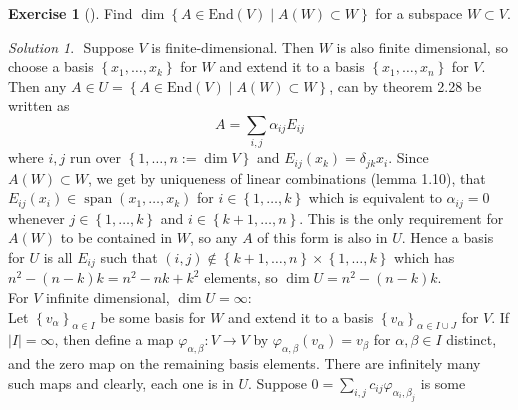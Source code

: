 \documentclass[reqno]{amsart}
\theoremstyle{definition}
\newtheorem{exercise}[theorem]{Exercise}
\theoremstyle{remark}
\newtheorem*{solution}{Solution}
\DeclareMathOperator{\Span}{span}
\newcommand{\End}{{\mathrm{End}}}
\begin{document}
    \begin{exercise}[]
        Find $\dim \left\{ A \in \End (V)  \mid A (W) \subset W
        \right\} $ for a subspace $W \subset V$.
    \end{exercise}

    \begin{solution}
        $ $ \newline
        Suppose $V$ is finite-dimensional.
        Then $W$ is also finite dimensional, so
        choose a basis $\left\{ x_1, \ldots, x_k \right\} $ for
        $W$ and extend it to a basis $\left\{ x_1,
        \ldots, x_n \right\} $ for $V$.
        Then
        any $A \in U = \left\{ A \in \End(V)  \mid A(W) \subset W
        \right\} $,
        can by
        theorem 2.28 be written as
        \[
        A = \sum_{i,j} \alpha_{ij} E_{ij}
        \] 
        where $i,j$ run over $ \left\{ 1, \ldots, n := \dim V 
        \right\} $ 
        and $E_{ij}(x_k) = \delta_{jk} x_i$.
        Since $A (W) \subset W$, we get by uniqueness of
        linear combinations (lemma 1.10), that
        $E_{ij} (x_i) \in \Span \left( x_1, \ldots, x_k \right) $ 
        for $i \in \left\{ 1,\ldots, k \right\} $ which is
        equivalent to $\alpha_{ij} = 0$ whenever
        $j \in \left\{ 1, \ldots, k \right\} $ and
        $i \in \left\{ k+1, \ldots, n \right\} $. This is the
        only requirement for $A(W)$ to be contained in $W$, so any
        $A$ of this form is also in
        $U$. Hence a basis for $U$ is
        all $E_{ij}$ such that $(i,j) \not\in 
        \left\{ k+1, \ldots,n \right\} \times 
        \left\{ 1, \ldots, k \right\} $ which has
        $n^2 - (n-k) k = n^2 - nk + k^2 $ elements, so
        $\dim U = n^2 - (n-k) k$.\\
        \linebreak
        For $V$ infinite dimensional, $\dim U = \infty$:\\
        \linebreak
        Let $\left\{ v_{\alpha} \right\}_{\alpha \in I} $ be some
        basis for $W$ and extend it to a basis 
        $\left\{ v_{\alpha} \right\}_{\alpha \in I \cup J}$ for
        $V$. If $\left| I \right| = \infty$, then
        define a map $\varphi_{\alpha, \beta}  \colon V \to V$ by
        $\varphi_{\alpha, \beta}  (v_{\alpha}) = v_{\beta}$ for
        $\alpha, \beta \in I$ distinct, and
        the zero map on the remaining basis elements.
        There are infinitely many 
        such maps and clearly, each one is in $U$. Suppose
        $0 = \sum_{i,j} c_{ij} \varphi_{\alpha_i, \beta_j}$ is some

\end{solution}
\end{document}
